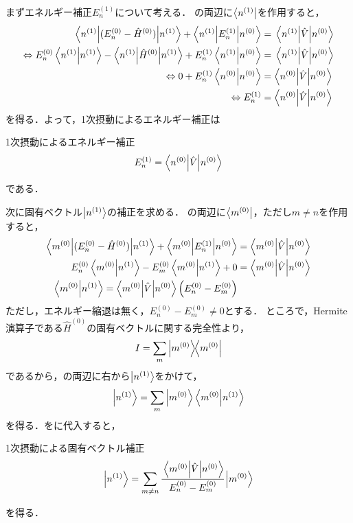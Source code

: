 \documentclass{report}
\begin{document}
  まずエネルギー補正$E_n^{(1)}$について考える．
  の両辺に$\bra{n^{(1)}}$を作用すると，
  \begin{align}
    \ev**{(E_n^{(0)} - \hat{H}^{(0)})}{n^{(1)}} + \mel**{n^{(1)}}{E_n^{(1)}}{n^{(0)}} &= \mel{n^{(1)}}{\hat{V}}{n^{(0)}} \\ 
    \Leftrightarrow E_n^{(0)}\braket{n^{(1)}} - \ev**{\hat{H}^{(0)}}{n^{(1)}} + E_n^{(1)}\braket{n^{(1)}}{n^{(0)}} &= \mel{n^{(1)}}{\hat{V}}{n^{(0)}} \\ 
    \Leftrightarrow 0 + E_n^{(1)}\braket{n^{(0)}} &= \ev**{\hat{V}}{n^{(0)}} \\ 
    \Leftrightarrow E_n^{(1)} &= \ev**{\hat{V}}{n^{(0)}}
  \end{align}
  を得る．よって，1次摂動によるエネルギー補正は
  \begin{itembox}[l]{1次摂動によるエネルギー補正}
    \begin{align}
      E_n^{(1)} = \ev**{\hat{V}}{n^{(0)}}
    \end{align}
  \end{itembox}
  である．
  \par
  次に固有ベクトル$\ket{n^{(1)}}$の補正を求める．
  の両辺に$\bra{m^{(0)}}$，ただし$m\neq n$を作用すると，
  \begin{align}
    \mel**{m^{(0)}}{(E_n^{(0)} - \hat{H}^{(0)})}{n^{(1)}} + \mel**{m^{(0)}}{E_n^{(1)}}{n^{(0)}} &= \mel**{m^{(0)}}{\hat{V}}{n^{(0)}} \\ 
    E_n^{(0)}\braket{m^{(0)}}{n^{(1)}} - E_m^{(0)}\braket{m^{(0)}}{n^{(1)}} + 0 &= \mel**{m^{(0)}}{\hat{V}}{n^{(0)}}\\
    \braket{m^{(0)}}{n^{(1)}} = \mel**{m^{(0)}}{\hat{V}}{n^{(0)}} \qty(E_n^{(0)} - E_m^{(0)}) \label{1st-perturbation-prep}\\
  \end{align}
  ただし，エネルギー縮退は無く，$E_n^{(0)}-E_m^{(0)} \neq 0$とする．
  ところで，Hermite演算子である$\hat{H}^{(0)}$の固有ベクトルに関する完全性より，
  \begin{align}
    I = \sum_{m}\ketbra{m^{(0)}}{m^{(0)}}\label{completeness}
  \end{align}
  であるから，の両辺に右から$\ket{n^{(1)}}$をかけて，
  \begin{align}
    \ket{n^{(1)}} = \sum_{m}\ket{m^{(0)}}\braket{m^{(0)}}{n^{(1)}}\label{n1-completeness-expantion}
  \end{align}
  を得る．をに代入すると，
  \begin{itembox}[l]{1次摂動による固有ベクトル補正}
    \begin{align}
      \ket{n^{(1)}} = \sum_{m\neq n}\cfrac{\mel**{m^{(0)}}{\hat{V}}{n^{(0)}}}{E_n^{(0)} - E_m^{(0)}}\ket{m^{(0)}}
    \end{align}
  \end{itembox}
  を得る．
\end{document}
